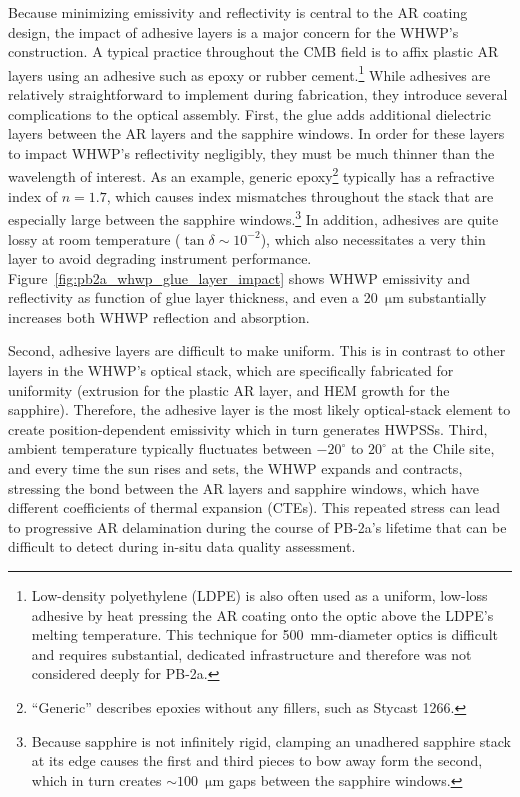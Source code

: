 Because minimizing emissivity and reflectivity is central to the AR coating design, the impact of adhesive layers is a major concern for the WHWP's construction. A typical practice throughout the CMB field is to affix plastic AR layers using an adhesive such as epoxy or rubber cement.\footnote{Low-density polyethylene (LDPE) is also often used as a uniform, low-loss adhesive by heat pressing the AR coating onto the optic above the LDPE's melting temperature. This technique for 500~mm-diameter optics is difficult and requires substantial, dedicated infrastructure and therefore was not considered deeply for PB-2a.} While adhesives are relatively straightforward to implement during fabrication, they introduce several complications to the optical assembly. First, the glue adds additional dielectric layers between the AR layers and the sapphire windows. In order for these layers to impact WHWP's reflectivity negligibly, they must be much thinner than the wavelength of interest. As an example, generic epoxy\footnote{``Generic'' describes epoxies without any fillers, such as Stycast 1266.} typically has a refractive index of $n = 1.7$, which causes index mismatches throughout the stack that are especially large between the sapphire windows.\footnote{Because sapphire is not infinitely rigid, clamping an unadhered sapphire stack at its edge causes the first and third pieces to bow away form the second, which in turn creates $\sim 100$~$\mathrm{\mu m}$ gaps between the sapphire windows.} In addition, adhesives are quite lossy at room temperature ($\tan \delta \sim 10^{-2}$), which also necessitates a very thin layer to avoid degrading instrument performance. Figure~\ref{fig:pb2a_whwp_glue_layer_impact} shows WHWP emissivity and reflectivity as function of glue layer thickness, and even a 20~$\mathrm{\mu m}$ substantially increases both WHWP reflection and absorption.

Second, adhesive layers are difficult to make uniform. This is in contrast to other layers in the WHWP's optical stack, which are specifically fabricated for uniformity (extrusion for the plastic AR layer, and HEM growth for the sapphire). Therefore, the adhesive layer is the most likely optical-stack element to create position-dependent emissivity which in turn generates HWPSSs. Third, ambient temperature typically fluctuates between $-20^{\circ}$ to $20^{\circ}$ at the Chile site, and every time the sun rises and sets, the WHWP expands and contracts, stressing the bond between the AR layers and sapphire windows, which have different coefficients of thermal expansion (CTEs). This repeated stress can lead to progressive AR delamination during the course of PB-2a's lifetime that can be difficult to detect during in-situ data quality assessment.

